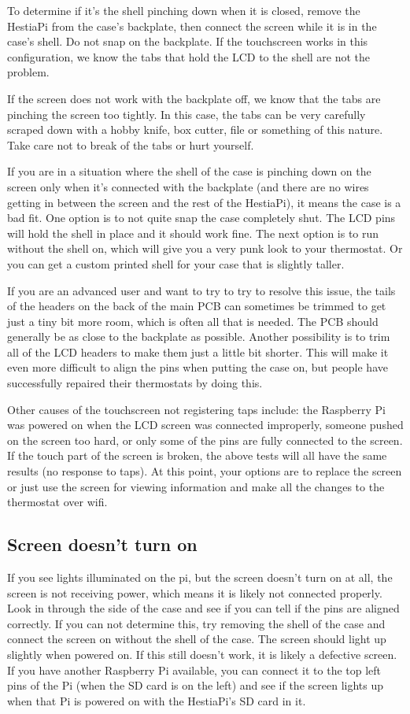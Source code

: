 To determine if it's the shell pinching down when it is closed, remove the
HestiaPi from the case's backplate, then connect the screen while it is in the
case's shell. Do not snap on the backplate. If the touchscreen works in this
configuration, we know the tabs that hold the LCD to the shell are not the
problem.

If the screen does not work with the backplate off, we know that the tabs are
pinching the screen too tightly. In this case, the tabs can be very carefully
scraped down with a hobby knife, box cutter, file or something of this nature.
Take care not to break of the tabs or hurt yourself.

If you are in a situation where the shell of the case is pinching down on the
screen only when it's connected with the backplate (and there are no wires
getting in between the screen and the rest of the HestiaPi), it means the case
is a bad fit. One option is to not quite snap the case completely shut. The LCD
pins will hold the shell in place and it should work fine. The next option is
to run without the shell on, which will give you a very punk look to your
thermostat. Or you can get a custom printed shell for your case that is slightly
taller.

If you are an advanced user and want to try to try to resolve this issue, the
tails of the headers on the back of the main PCB can sometimes be trimmed to
get just a tiny bit more room, which is often all that is needed. The PCB
should generally be as close to the backplate as possible. Another possibility
is to trim all of the LCD headers to make them just a little bit shorter. This
will make it even more difficult to align the pins when putting the case on,
but people have successfully repaired their thermostats by doing this.

Other causes of the touchscreen not registering taps include: the Raspberry Pi
was powered on when the LCD screen was connected improperly, someone pushed on
the screen too hard, or only some of the pins are fully connected to the
screen. If the touch part of the screen is broken, the above tests will all
have the same results (no response to taps). At this point, your options are to
replace the screen or just use the screen for viewing information and make all
the changes to the thermostat over wifi.

\subsection{Screen doesn't turn on}
If you see lights illuminated on the pi, but the screen doesn't turn on at all,
the screen is not receiving power, which means it is likely not connected
properly. Look in through the side of the case and see if you can tell if the
pins are aligned correctly. If you can not determine this, try removing the
shell of the case and connect the screen on without the shell of the case. The
screen should light up slightly when powered on. If this still doesn't work, it
is likely a defective screen. If you have another Raspberry Pi available, you
can connect it to the top left pins of the Pi (when the SD card is on the left)
and see if the screen lights up when that Pi is powered on with the HestiaPi's
SD card in it.

